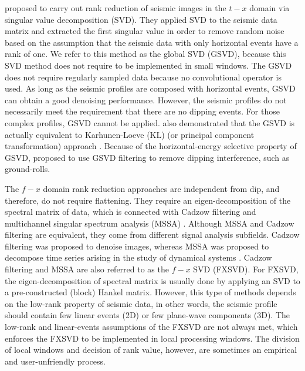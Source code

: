 \cite{freire1988svdsnr} proposed to carry out rank reduction of seismic images in the $t-x$ domain via singular value decomposition (SVD). They applied SVD to the seismic data matrix and extracted the first singular value in order to remove random noise based on the assumption that the seismic data with only horizontal events have a rank of one. We refer to this method as the global SVD (GSVD), because this SVD method does not require to be implemented in small windows. The GSVD does not require regularly sampled data because no convolutional operator is used. As long as the seismic profiles are composed with horizontal events, GSVD can obtain a good denoising performance. However, the seismic profiles do not necessarily meet the requirement that there are no dipping events. For those complex profiles, GSVD cannot be applied. \cite{freire1988svdsnr} also demonstrated that the GSVD is actually equivalent to Karhunen-Loeve (KL) (or principal component transformation) approach \cite[]{jones1987}. Because of the horizontal-energy selective property of GSVD, \cite{milton2009} proposed to use GSVD filtering to remove dipping interference, such as ground-rolls.  

The $f-x$ domain rank reduction approaches are independent from dip, and therefore, do not require flattening. They require an eigen-decomposition of the spectral matrix of data, which is connected with Cadzow filtering \cite[]{cadzow1988} and multichannel singular spectrum analysis (MSSA) \cite[]{vautard1992,mssa}.
Although MSSA and Cadzow filtering are equivalent, they come from different signal analysis subfields. Cadzow filtering was proposed to denoise images, whereas MSSA was proposed to decompose time series arising in the study of dynamical systems \cite[]{oropeza2010}. Cadzow filtering and MSSA are also referred to as the $f-x$ SVD (FXSVD). For FXSVD, the eigen-decomposition of spectral matrix is usually done by applying an SVD to a pre-constructed (block) Hankel matrix. However, this type of methods depends on the low-rank property of seismic data, in other words, the seismic profile should contain few linear events (2D) or few plane-wave components (3D). The low-rank and linear-events assumptions of the FXSVD are not always met, which enforces the FXSVD to be implemented in local processing windows. The division of local windows and decision of rank value, however, are sometimes an empirical and user-unfriendly process.

